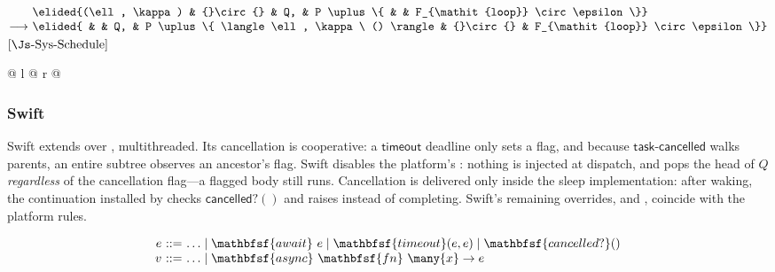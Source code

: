 \vspace{1em}
\noindent
$\begin{array}[t]{@{}r@{\ }l@{}l@{}l@{\ }l@{}l@{}l@{}}
                & \elided{(\ell, \kappa) & {}\circ{} & Q, & P \uplus \{ & & F_{\mathit{loop}} \circ \epsilon \}} \\
\longrightarrow & \elided{               &           & Q, & P \uplus \{ \langle \ell, \kappa\ () \rangle & {}\circ{} & F_{\mathit{loop}} \circ \epsilon \}}
\end{array}$\hfill$\text{[\Js-Sys-Schedule]}$\par
\noindent
\begin{tabular*}{\linewidth}{@{} l @{\extracolsep{\fill}} r @{}}
\end{tabular*}
\vspace{0.7em}

\subsubsection{Swift}

Swift extends \lasync over \exn, multithreaded. Its cancellation is cooperative: a $\mathsf{timeout}$ deadline only sets a flag, and because $\mathsf{task\text{-}cancelled}$ walks parents, an entire subtree observes an ancestor's flag. Swift disables the platform's : nothing is injected at dispatch, and  pops the head of $Q$ \emph{regardless} of the cancellation flag---a flagged body still runs. Cancellation is delivered only inside the sleep implementation: after waking, the continuation installed by  checks $\mathsf{cancelled?}()$ and raises instead of completing. Swift's remaining overrides,  and , coincide with the platform rules.

$$
\begin{array}{r@{\ }c@{\ }l}
e & ::= & \ldots \mid \mathbfsf{await}\ e \mid \mathbfsf{timeout}(e, e) \mid \mathbfsf{cancelled?}() \\
v & ::= & \ldots \mid \mathbfsf{async}\ \mathbfsf{fn}\ \many{x} \to e
\end{array}
$$

